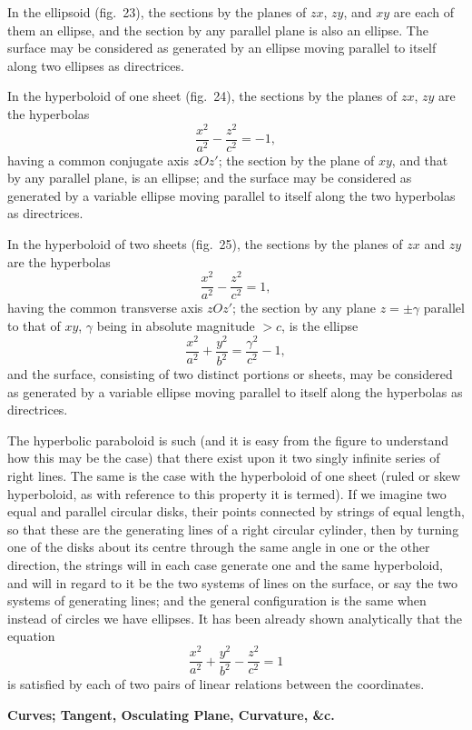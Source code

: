 \documentclass[11pt,a4paper]{article}
\begin{document}
In the ellipsoid (fig.~23), the sections by the planes of $zx$, $zy$, and $xy$ are each of them an ellipse, and the section by any parallel plane is also an ellipse. The surface may be considered as generated by an ellipse moving parallel to itself along two ellipses as directrices.

In the hyperboloid of one sheet (fig.~24), the sections by the planes of $zx$, $zy$ are the hyperbolas
\[
\frac{x^{2}}{a^{2}} - \frac{z^{2}}{c^{2}} = -1,
\]
having a common conjugate axis $zOz'$; the section by the plane of $xy$, and that by any parallel plane, is an ellipse; and the surface may be considered as generated by a variable ellipse moving parallel to itself along the two hyperbolas as directrices.

In the hyperboloid of two sheets (fig.~25), the sections by the planes of $zx$ and $zy$ are the hyperbolas
\[
\frac{x^{2}}{a^{2}} - \frac{z^{2}}{c^{2}} = 1,
\]
having the common transverse axis $zOz'$; the section by any plane $z = \pm\gamma$ parallel to that of $xy$, $\gamma$ being in absolute magnitude $> c$, is the ellipse
\[
\frac{x^{2}}{a^{2}} + \frac{y^{2}}{b^{2}} = \frac{\gamma^{2}}{c^{2}} - 1,
\]
and the surface, consisting of two distinct portions or sheets, may be considered as generated by a variable ellipse moving parallel to itself along the hyperbolas as directrices.

The hyperbolic paraboloid is such (and it is easy from the figure to understand how this may be the case) that there exist upon it two singly infinite series of right lines. The same is the case with the hyperboloid of one sheet (ruled or skew hyperboloid, as with reference to this property it is termed). If we imagine two equal and parallel circular disks, their points connected by strings of equal length, so that these are the generating lines of a right circular cylinder, then by turning one of the disks about its centre through the same angle in one or the other direction, the strings will in each case generate one and the same hyperboloid, and will in regard to it be the two systems of lines on the surface, or say the two systems of generating lines; and the general configuration is the same when instead of circles we have ellipses. It has been already shown analytically that the equation
\[
\frac{x^{2}}{a^{2}} + \frac{y^{2}}{b^{2}} - \frac{z^{2}}{c^{2}} = 1
\]
is satisfied by each of two pairs of linear relations between the coordinates.

\bigskip
\noindent\textbf{Curves; Tangent, Osculating Plane, Curvature, \&c.}
\end{document}
